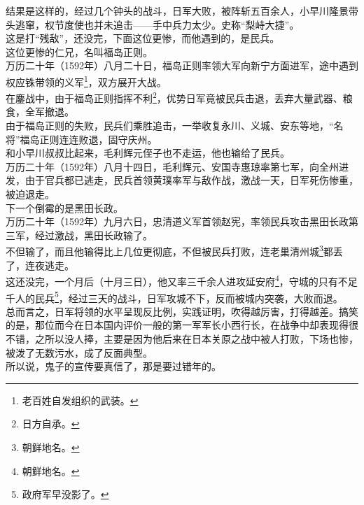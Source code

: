 \begin{multicols}{\theparacolNo}
结果是这样的，经过几个钟头的战斗，日军大败，被阵斩五百余人，小早川隆景带头逃窜，权节度使也并未追击——手中兵力太少。史称“梨峙大捷”。\\

这是打“残敌”，还没完，下面这位更惨，而他遇到的，是民兵。\\

这位更惨的仁兄，名叫福岛正则。\\

万历二十年（1592年）八月二十日，福岛正则率领大军向新宁方面进军，途中遇到权应铢带领的义军\footnote{老百姓自发组织的武装。}，双方展开大战。\\

在鏖战中，由于福岛正则指挥不利\footnote{日方自承。}，优势日军竟被民兵击退，丢弃大量武器、粮食，全军撤退。\\

由于福岛正则的失败，民兵们乘胜追击，一举收复永川、义城、安东等地，“名将”福岛正则连连败退，固守庆州。\\

和小早川叔叔比起来，毛利辉元侄子也不走运，他也输给了民兵。\\

万历二十年（1592年）八月十四日，毛利辉元、安国寺惠琼率第七军，向全州进发，由于官兵都已逃走，民兵首领黄璞率军与敌作战，激战一天，日军死伤惨重，被迫退走。\\

下一个倒霉的是黑田长政。\\

万历二十年（1592年）九月六日，忠清道义军首领赵宪，率领民兵攻击黑田长政第三军，经过激战，黑田长政输了。\\

不但输了，而且他输得比上几位更彻底，不但被民兵打败，连老巢清州城\footnote{朝鲜地名。}都丢了，连夜逃走。\\

这还没完，一个月后（十月三日），他又率三千余人进攻延安府\footnote{朝鲜地名。}，守城的只有不足千人的民兵\footnote{政府军早没影了。}，经过三天的战斗，日军攻城不下，反而被城内突袭，大败而退。\\

总而言之，日军将领的水平呈现反比例，实践证明，吹得越厉害，打得越差。搞笑的是，那位而今在日本国内评价一般的第一军军长小西行长，在战争中却表现得很不错，之所以没人捧，主要是因为他后来在日本关原之战中被人打败，下场也惨，被泼了无数污水，成了反面典型。\\

所以说，鬼子的宣传要真信了，那是要过错年的。\\


\end{multicols}
